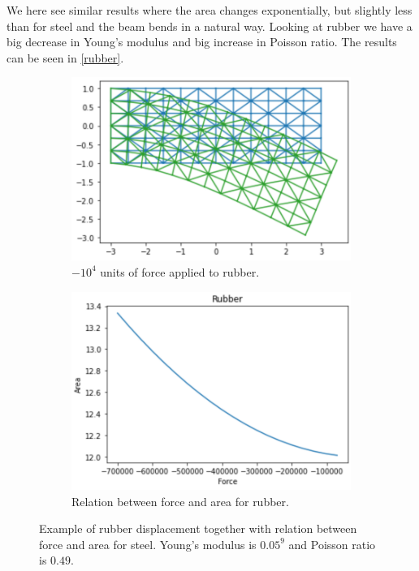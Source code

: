 We here see similar results where the area changes exponentially, but slightly less than for steel and the beam bends in a natural way. Looking at rubber we have a big decrease in Young's modulus and big increase in Poisson ratio. The results can be seen in \autoref{rubber}.
\begin{figure}[H]
	\centering
	\begin{subfigure}[b]{0.49\linewidth}
		\centering
		\includegraphics[width=\linewidth]{Materials/Rubberviz}
		\caption{$-10^4$ units of force applied to rubber.}
	\end{subfigure}
	\hfill
	\begin{subfigure}[b]{0.49\linewidth}
		\centering
		\includegraphics[width=\linewidth]{Materials/RubberArea}
		\caption{Relation between force and area for rubber.}
	\end{subfigure}
	\caption{Example of rubber displacement together with relation between force and area for steel. Young's modulus is $0.05^9$ and Poisson ratio is $0.49$.}
	\label{rubber}
\end{figure}
